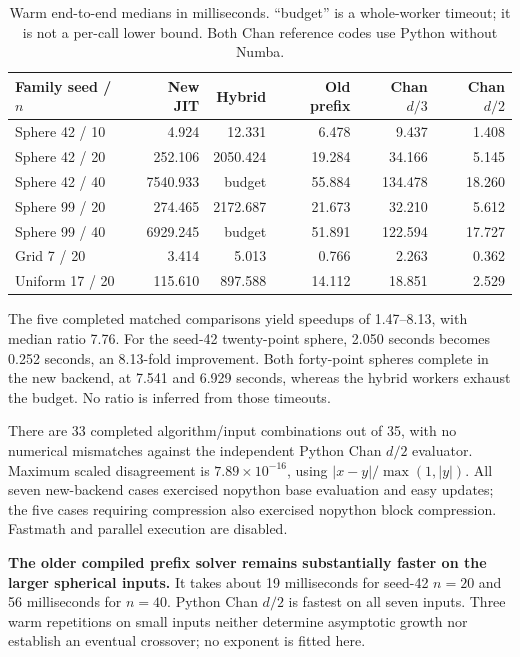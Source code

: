 \documentclass[12pt,a4paper]{article}
\begin{document}
\begin{table}[ht]\centering\small
\setlength{\tabcolsep}{4pt}
\begin{tabular}{lrrrrr}\toprule
Family seed / $n$ & New JIT & Hybrid & Old prefix & Chan $d/3$ & Chan $d/2$\\\midrule
Sphere 42 / 10 & 4.924 & 12.331 & 6.478 & 9.437 & 1.408\\
Sphere 42 / 20 & 252.106 & 2050.424 & 19.284 & 34.166 & 5.145\\
Sphere 42 / 40 & 7540.933 & budget & 55.884 & 134.478 & 18.260\\
Sphere 99 / 20 & 274.465 & 2172.687 & 21.673 & 32.210 & 5.612\\
Sphere 99 / 40 & 6929.245 & budget & 51.891 & 122.594 & 17.727\\
Grid 7 / 20 & 3.414 & 5.013 & 0.766 & 2.263 & 0.362\\
Uniform 17 / 20 & 115.610 & 897.588 & 14.112 & 18.851 & 2.529\\
\bottomrule\end{tabular}
\caption{Warm end-to-end medians in milliseconds. ``budget'' is a whole-worker
timeout; it is not a per-call lower bound. Both Chan reference codes use Python
without Numba.}
\label{tab:timings}
\end{table}

The five completed matched comparisons yield speedups of
1.47--8.13, with median ratio 7.76. For the seed-42 twenty-point sphere,
2.050 seconds becomes 0.252 seconds, an 8.13-fold improvement. Both forty-point
spheres complete in the new backend, at 7.541 and 6.929 seconds, whereas the
hybrid workers exhaust the budget. No ratio is inferred from those timeouts.

There are 33 completed algorithm/input combinations out of 35, with no
numerical mismatches against the independent Python Chan $d/2$ evaluator.
Maximum scaled disagreement is $7.89\times10^{-16}$, using
$|x-y|/\max(1,|y|)$. All seven new-backend cases exercised nopython
base evaluation and easy updates; the five cases requiring compression also
exercised nopython block compression. Fastmath and parallel execution are disabled.

\textbf{The older compiled prefix solver remains substantially faster on the
larger spherical inputs.} It takes about 19 milliseconds for seed-42 $n=20$
and 56 milliseconds for $n=40$. Python Chan $d/2$ is fastest on all seven
inputs. Three warm repetitions on small inputs neither determine asymptotic
growth nor establish an eventual crossover; no exponent is fitted here.
\end{document}
